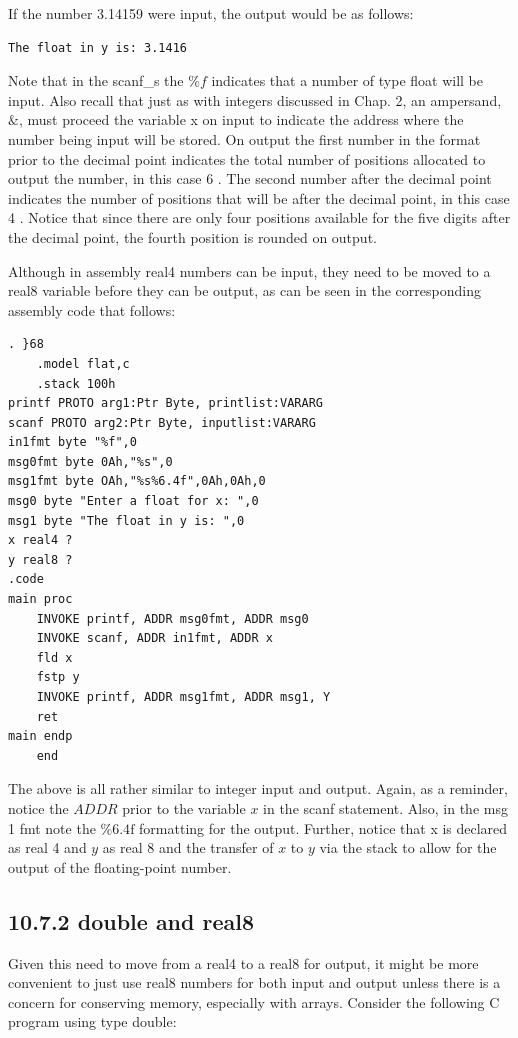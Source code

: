 \documentclass[10pt]{article}
\begin{document}
If the number 3.14159 were input, the output would be as follows:

\begin{verbatim}
The float in y is: 3.1416
\end{verbatim}

Note that in the scanf\_s the $\% f$ indicates that a number of type float will be input. Also recall that just as with integers discussed in Chap. 2, an ampersand, $\&$, must proceed the variable x on input to indicate the address where the number being input will be stored. On output the first number in the format prior to the decimal point indicates the total number of positions allocated to output the number, in this case 6 . The second number after the decimal point indicates the number of positions that will be after the decimal point, in this case 4 . Notice that since there are only four positions available for the five digits after the decimal point, the fourth position is rounded on output.

Although in assembly real4 numbers can be input, they need to be moved to a real8 variable before they can be output, as can be seen in the corresponding assembly code that follows:

\begin{verbatim}
. }68
    .model flat,c
    .stack 100h
printf PROTO arg1:Ptr Byte, printlist:VARARG
scanf PROTO arg2:Ptr Byte, inputlist:VARARG
in1fmt byte "%f",0
msg0fmt byte 0Ah,"%s",0
msg1fmt byte OAh,"%s%6.4f",0Ah,0Ah,0
msg0 byte "Enter a float for x: ",0
msg1 byte "The float in y is: ",0
x real4 ?
y real8 ?
.code
main proc
    INVOKE printf, ADDR msg0fmt, ADDR msg0
    INVOKE scanf, ADDR in1fmt, ADDR x
    fld x
    fstp y
    INVOKE printf, ADDR msg1fmt, ADDR msg1, Y
    ret
main endp
    end
\end{verbatim}

The above is all rather similar to integer input and output. Again, as a reminder, notice the $A D D R$ prior to the variable $x$ in the scanf statement. Also, in the msg 1 fmt note the $\% 6.4 \mathrm{f}$ formatting for the output. Further, notice that x is declared as real 4 and $y$ as real 8 and the transfer of $x$ to $y$ via the stack to allow for the output of the floating-point number.

\subsection*{10.7.2 double and real8}
Given this need to move from a real4 to a real8 for output, it might be more convenient to just use real8 numbers for both input and output unless there is a concern for conserving memory, especially with arrays. Consider the following C program using type double:
\end{document}
